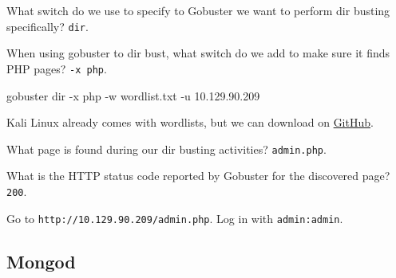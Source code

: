 \documentclass[a4paper,12pt]{article}
\newcommand{\bashinline}[1]{\texttt{#1}}
\begin{document}
What switch do we use to specify to Gobuster we want to perform dir busting specifically? \bashinline{dir}.

When using gobuster to dir bust, what switch do we add to make sure it finds PHP pages? \bashinline{-x php}.
\begin{bash}
gobuster dir -x php -w wordlist.txt -u 10.129.90.209
\end{bash}

Kali Linux already comes with wordlists, but we can download on \href{https://github.com/daviddias/node-dirbuster/blob/master/lists/directory-list-2.3-medium.txt}{GitHub}.

What page is found during our dir busting activities? \bashinline{admin.php}.

What is the HTTP status code reported by Gobuster for the discovered page? \bashinline{200}.

Go to \bashinline{http://10.129.90.209/admin.php}. Log in with \bashinline{admin:admin}.

\subsection{Mongod \faLinux}
\end{document}
